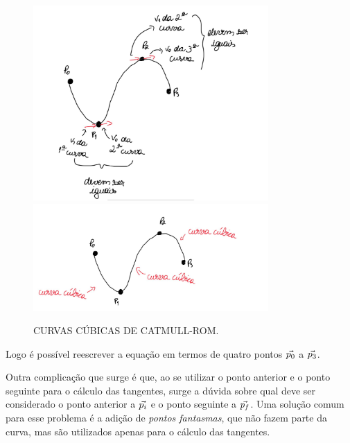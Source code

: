 \begin{figure}[h!]
    \caption{CURVAS CÚBICAS DE CATMULL-ROM.}
    \centering
    \includegraphics[width=0.8\textwidth]{fig/s1.jpg}
    \vspace{0.5em} %
    \includegraphics[width=0.8\textwidth]{fig/s2.jpg}
    \label{fig:spline_tangentes}
\end{figure}

Logo é possível reescrever a equação em termos de quatro pontos ${\vec{p_0}}$ a ${\vec{p_3}}$.

Outra complicação que surge é que, ao se utilizar o ponto anterior e o ponto seguinte para o cálculo das tangentes, surge a dúvida sobre qual deve ser considerado o ponto anterior a ${\vec{p_i}}$ e o ponto seguinte a ${\vec{p_f}}$. Uma solução comum para esse problema é a adição de \textit{pontos fantasmas}, que não fazem parte da curva, mas são utilizados apenas para o cálculo das tangentes.



